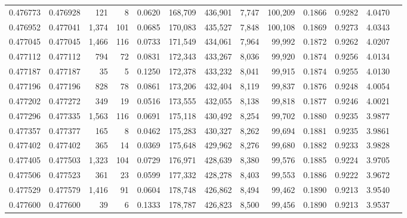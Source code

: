 \begin{tabular}{rrrrrrrrrrrrr}
0.476773 & 0.476928 &   121 &     8 &                                     0.0620 & 168,709 & 436,901 &   7,747 & 100,209 & 0.1866 & 0.9282 & 4.0470 \\
0.476952 & 0.477041 & 1,374 &   101 &                                     0.0685 & 170,083 & 435,527 &   7,848 & 100,108 & 0.1869 & 0.9273 & 4.0343 \\
0.477045 & 0.477045 & 1,466 &   116 &                                     0.0733 & 171,549 & 434,061 &   7,964 &  99,992 & 0.1872 & 0.9262 & 4.0207 \\
0.477112 & 0.477112 &   794 &    72 &                                     0.0831 & 172,343 & 433,267 &   8,036 &  99,920 & 0.1874 & 0.9256 & 4.0134 \\
0.477187 & 0.477187 &    35 &     5 &                                     0.1250 & 172,378 & 433,232 &   8,041 &  99,915 & 0.1874 & 0.9255 & 4.0130 \\
0.477196 & 0.477196 &   828 &    78 &                                     0.0861 & 173,206 & 432,404 &   8,119 &  99,837 & 0.1876 & 0.9248 & 4.0054 \\
0.477202 & 0.477272 &   349 &    19 &                                     0.0516 & 173,555 & 432,055 &   8,138 &  99,818 & 0.1877 & 0.9246 & 4.0021 \\
0.477296 & 0.477335 & 1,563 &   116 &                                     0.0691 & 175,118 & 430,492 &   8,254 &  99,702 & 0.1880 & 0.9235 & 3.9877 \\
0.477357 & 0.477377 &   165 &     8 &                                     0.0462 & 175,283 & 430,327 &   8,262 &  99,694 & 0.1881 & 0.9235 & 3.9861 \\
0.477402 & 0.477402 &   365 &    14 &                                     0.0369 & 175,648 & 429,962 &   8,276 &  99,680 & 0.1882 & 0.9233 & 3.9828 \\
0.477405 & 0.477503 & 1,323 &   104 &                                     0.0729 & 176,971 & 428,639 &   8,380 &  99,576 & 0.1885 & 0.9224 & 3.9705 \\
0.477506 & 0.477523 &   361 &    23 &                                     0.0599 & 177,332 & 428,278 &   8,403 &  99,553 & 0.1886 & 0.9222 & 3.9672 \\
0.477529 & 0.477579 & 1,416 &    91 &                                     0.0604 & 178,748 & 426,862 &   8,494 &  99,462 & 0.1890 & 0.9213 & 3.9540 \\
0.477600 & 0.477600 &    39 &     6 &                                     0.1333 & 178,787 & 426,823 &   8,500 &  99,456 & 0.1890 & 0.9213 & 3.9537 \\

\end{tabular}
